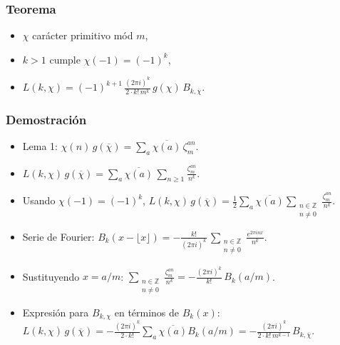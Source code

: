 \documentclass{beamer}
\begin{document}
\begin{frame}
  \frametitle{Teorema}

  \begin{itemize}
  \item<1-> $\chi$ carácter primitivo mód $m$,

  \item<2-> $k > 1$ cumple $\chi (-1) = (-1)^k$,

  \item<3-> $L (k,\chi) = (-1)^{k+1} \, \frac{(2\pi i)^k}{2\cdot k! \, m^k}\,g (\chi)\,B_{k,\overline{\chi}}$.
  \end{itemize}
\end{frame}


\begin{frame}
  \frametitle{Demostración}

  \begin{itemize}
  \item<1-> Lema 1: $\chi (n)\,g (\overline{\chi}) = \sum_a \overline{\chi (a)}\,\zeta^{an}_m$.

  \item<2-> $L (k,\chi)\,g (\overline{\chi}) = \sum_a \overline{\chi (a)} \, \sum_{n\ge 1} \frac{\zeta_m^{an}}{n^k}$.

  \item<3-> Usando $\chi (-1) = (-1)^k$,
    $L (k,\chi)\,g (\overline{\chi}) = \frac{1}{2} \sum_a \overline{\chi (a)} \sum_{\substack{n \in \mathbb{Z} \\ n \ne 0}} \frac{\zeta_m^{an}}{n^k}$.

  \item<4-> Serie de Fourier: $B_k (x - \lfloor x\rfloor) = -\frac{k!}{(2\pi i)^k} \, \sum_{\substack{n \in \mathbb{Z} \\ n \ne 0}} \frac{e^{2\pi i n x}}{n^k}$.

  \item<5-> Sustituyendo $x = a/m$:
    $\sum_{\substack{n \in \mathbb{Z} \\ n \ne 0}} \frac{\zeta_m^{an}}{n^k} = -\frac{(2\pi i)^k}{k!}\,B_k (a/m)$.

  \item<6-> Expresión para $B_{k,\chi}$ en términos de $B_k (x)$:
    $L (k,\chi)\,g (\overline{\chi}) = -\frac{(2\pi i)^k}{2\cdot k!} \sum_a \overline{\chi (a)} B_k (a/m) = -\frac{(2\pi i)^k}{2\cdot k!\,m^{k-1}}\,B_{k,\overline{\chi}}$.
  \end{itemize}
\end{frame}
\end{document}

